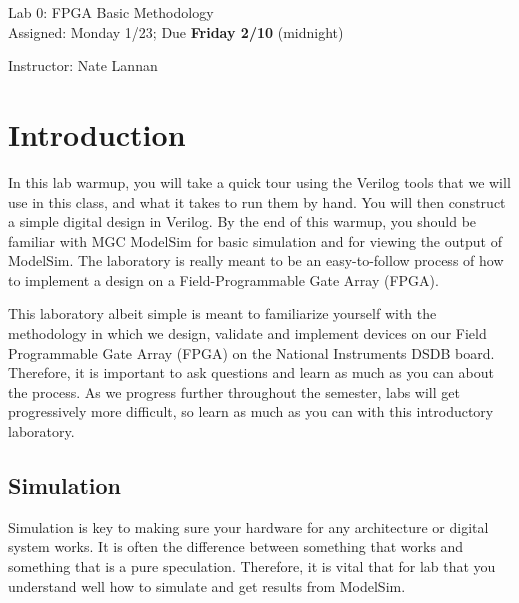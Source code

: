 \documentclass{article}
\newcommand{\myassignment}{Lab 0: FPGA Basic Methodology}
\newcommand{\myduedate}{Assigned: Monday 1/23; Due \textbf{Friday 2/10} (midnight)}
\newcommand{\myinstructor}{Instructor: Nate Lannan}
\begin{document}
\begin{center}
  {\huge \myassignment} \\
  {\large \myduedate} \\
  \begin{flushright}
  \myinstructor \\
  \end{flushright}
\end{center}

\section{Introduction}

In this lab warmup, you will take a quick tour using the 
Verilog tools that we will use
in this class, and what it takes to run them by hand. You will then
construct a simple digital design in Verilog.
By the end of this warmup, you should be
familiar with MGC ModelSim for basic simulation and for viewing the
output of ModelSim. The laboratory is really meant to be an
easy-to-follow process of how to implement a design on a
Field-Programmable Gate Array (FPGA).

This laboratory albeit simple
is meant to familiarize yourself with the methodology in which we
design, validate and implement devices on our Field Programmable Gate
Array (FPGA) on the National Instruments DSDB board.  Therefore, it is
important to ask questions and learn as much as you can about the
process.  As we progress further throughout the semester, labs will
get progressively more difficult, so learn as much as you can with
this introductory laboratory.

\subsection{Simulation}

Simulation is key to making sure your hardware for any architecture or
digital system works.  It is often the difference between something
that works and something that is a pure speculation.  Therefore, it is
vital that for lab that you understand well how to simulate and get
results from ModelSim.
\end{document}
